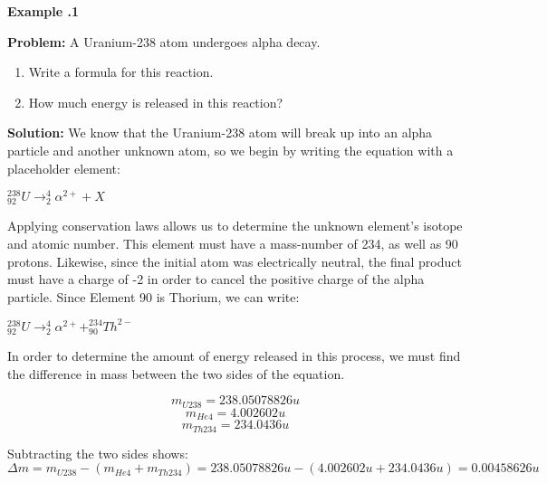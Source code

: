 \begin{mdframed}[backgroundcolor=blue!10!white]
	\begin{center}
		
		
		\textbf{Example \thesection.1}	
	\end{center}
	
	\textbf{Problem: }A Uranium-238 atom undergoes alpha decay.  
	\begin{enumerate}
		\item Write a formula for this reaction.  
		\item How much energy is released in this reaction?  
	\end{enumerate}
	
	\vspace{0.1in}
	
	\textbf{Solution:} 
	We know that the Uranium-238 atom will break up into an alpha particle and another unknown atom, so we begin by writing the equation with a placeholder element:
	
	\begin{center}
		$^{238}_{92} U \longrightarrow ^{4}_{2}\alpha^{2+} + X$
	\end{center}
	
Applying conservation laws allows us to determine the unknown element's isotope and atomic number.  This element must have a mass-number of 234, as well as 90 protons.  Likewise, since the initial atom was electrically neutral, the final product must have a charge of -2 in order to cancel the positive charge of the alpha particle.  Since Element 90 is Thorium, we can write: 

	\begin{center}
		$\boxed{^{238}_{92} U \longrightarrow ^{4}_{2}\alpha^{2+} + ^{234}_{90}Th^{2-}}$
\end{center}  

In order to determine the amount of energy released in this process, we must find the difference in mass between the two sides of the equation.  

\begin{equation*}
m_{U238} = 238.05078826 \si{u}
\end{equation*}
\begin{equation*}
m_{He4} = 4.002602 \si{u}
\end{equation*}
\begin{equation*}
m_{Th234} = 234.0436 \si{u} 
\end{equation*}

Subtracting the two sides shows: 
\begin{equation*}
\Delta m = m_{U238} - (m_{He4} + m_{Th234}) = 238.05078826 \si{u} - (4.002602 \si{u} + 234.0436 \si{u} ) = 0.00458626 \si{u}
\end{equation*}


\end{mdframed}
